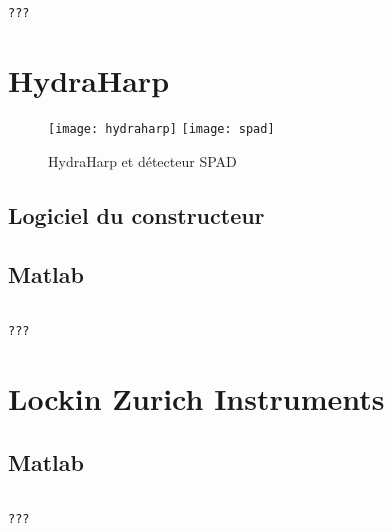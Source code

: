 \documentclass[11pt,francais]{book} %
\begin{document}
\begin{lstlisting}[frame=single,caption={Exemple d'utilisation de Winspec avec Python},label={lst:exwinspec},breaklines=true,]  % Start your code-block

???
\end{lstlisting}


\section{HydraHarp}

\begin{figure}[h]
  \centering\texttt{[image: hydraharp]}
  \centering\texttt{[image: spad]}
  \caption{HydraHarp et détecteur SPAD}
  \label{fig:hydraharp}
\end{figure}

\subsection{Logiciel du constructeur}

\subsection{Matlab}

\begin{lstlisting}[frame=single,caption={Exemple d'utilisation de HydraHarp avec Matlab},label={lst:exhydraharp},breaklines=true,]  % Start your code-block

???
\end{lstlisting}


\section{Lockin Zurich Instruments}

\subsection{Matlab}

\begin{lstlisting}[frame=single,caption={Exemple d'utilisation du lockin Surich Instruments avec Matlab},label={lst:exlockinzi},breaklines=true,]  % Start your code-block
  
???
\end{lstlisting}
\end{document}

